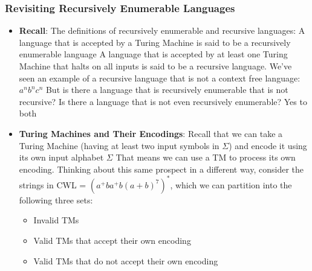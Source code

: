 \documentclass{report}
\begin{document}
    \subsubsection{Revisiting Recursively Enumerable Languages}
    \begin{itemize}
        \item \textbf{Recall}:  The definitions of recursively enumerable and recursive languages: A language that is accepted by a Turing Machine is said to be a recursively enumerable language
            \bigbreak \noindent 
            A language that is accepted by at least one Turing Machine that halts on all inputs is said to be a recursive language.
            \bigbreak \noindent 
            \bigbreak \noindent 
            We’ve seen an example of a recursive language that is not a context free language: $a^{n}b^{n}c^{n}$
            \bigbreak \noindent 
            But is there a language that is recursively enumerable that is not recursive? Is there a language that is not even recursively enumerable?
            \bigbreak \noindent 
            Yes to both 
        \item \textbf{Turing Machines and Their Encodings}: Recall that we can take a Turing Machine (having at least two input symbols in $\Sigma$) and encode it using its own input alphabet $\Sigma$
            \bigbreak \noindent 
            That means we can use a TM to process its own encoding.
            \bigbreak \noindent 
            Thinking about this same prospect in a different way, consider the strings in CWL = $(a^{+}ba^{+}b(a+b)^{7})^{*}$, which we can partition into the following three sets:
            \begin{itemize}
                \item Invalid TMs
                \item Valid TMs that accept their own encoding
                \item Valid TMs that do not accept their own encoding


\end{itemize}
\end{itemize}
\end{document}

